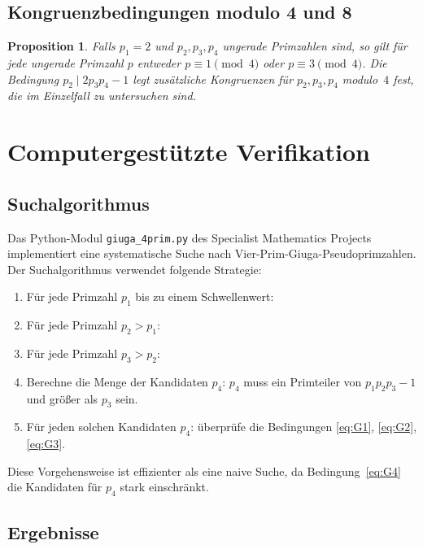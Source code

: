 \documentclass[12pt,a4paper]{amsart}
\newtheorem{proposition}[theorem]{Proposition}
\theoremstyle{definition}
\begin{document}
\subsection{Kongruenzbedingungen modulo 4 und 8}

\begin{proposition}
\label{prop:mod4}
Falls $p_1 = 2$ und $p_2, p_3, p_4$ ungerade Primzahlen sind, so gilt für
jede ungerade Primzahl $p$ entweder $p \equiv 1 \pmod{4}$ oder
$p \equiv 3 \pmod{4}$.  Die Bedingung $p_2 \mid 2 p_3 p_4 - 1$ legt
zusätzliche Kongruenzen für $p_2, p_3, p_4$ modulo~$4$ fest, die im
Einzelfall zu untersuchen sind.
\end{proposition}

\section{Computergestützte Verifikation}
\label{sec:rechner}

\subsection{Suchalgorithmus}

Das Python-Modul \texttt{giuga\_4prim.py} des Specialist Mathematics Projects
implementiert eine systematische Suche nach Vier-Prim-Giuga-Pseudoprimzahlen.
Der Suchalgorithmus verwendet folgende Strategie:

\begin{enumerate}
  \item Für jede Primzahl $p_1$ bis zu einem Schwellenwert:
  \item Für jede Primzahl $p_2 > p_1$:
  \item Für jede Primzahl $p_3 > p_2$:
  \item Berechne die Menge der Kandidaten $p_4$: $p_4$ muss ein Primteiler
        von $p_1 p_2 p_3 - 1$ und größer als $p_3$ sein.
  \item Für jeden solchen Kandidaten $p_4$: überprüfe die Bedingungen
        \eqref{eq:G1}, \eqref{eq:G2}, \eqref{eq:G3}.
\end{enumerate}

Diese Vorgehensweise ist effizienter als eine naive Suche, da
Bedingung~\eqref{eq:G4} die Kandidaten für $p_4$ stark einschränkt.

\subsection{Ergebnisse}
\end{document}
